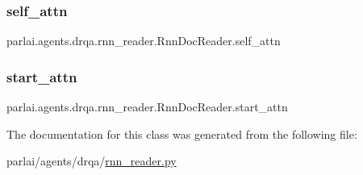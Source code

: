 \subsubsection{\texorpdfstring{self\+\_\+attn}{self\_attn}}
{\footnotesize\ttfamily parlai.\+agents.\+drqa.\+rnn\+\_\+reader.\+Rnn\+Doc\+Reader.\+self\+\_\+attn}

\mbox{\label{classparlai_1_1agents_1_1drqa_1_1rnn__reader_1_1RnnDocReader_ad3f35e5ca950ee0bc56ba3dd41f38fdb}} 
\subsubsection{\texorpdfstring{start\+\_\+attn}{start\_attn}}
{\footnotesize\ttfamily parlai.\+agents.\+drqa.\+rnn\+\_\+reader.\+Rnn\+Doc\+Reader.\+start\+\_\+attn}



The documentation for this class was generated from the following file\+:\begin{DoxyCompactItemize}
\item 
parlai/agents/drqa/\hyperlink{rnn__reader_8py}{rnn\+\_\+reader.\+py}\end{DoxyCompactItemize}
